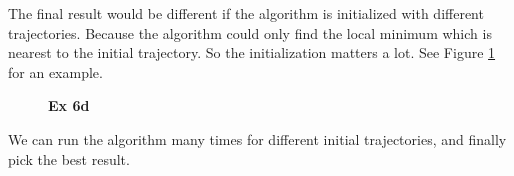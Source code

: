 \documentclass[
  course = {{16-811 Math Fundamentals for Robotics}},
  quartile = {{1}},
  assignment = 4,
  name = {{Kangle Deng}},
  email = {{kangled@andrew.cmu.edu}},
  firstexercise = 1
]{aga-homework}
\begin{document}
\subexercise
The final result would be different if the algorithm is initialized with different trajectories. Because the algorithm could only find the local minimum which is nearest to the initial trajectory. So the initialization matters a lot. See Figure \ref{fig:hw4_ex6d} for an example.

\begin{figure}
    \centering
    \caption{\textbf{Ex 6d}}
    \label{fig:hw4_ex6d}
\end{figure}

\subexercise
We can run the algorithm many times for different initial trajectories, and finally pick the best result.
\end{document}
